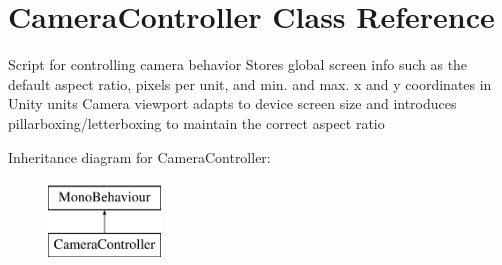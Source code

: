 \hypertarget{class_camera_controller}{}\section{Camera\+Controller Class Reference}
\label{class_camera_controller}


Script for controlling camera behavior Stores global screen info such as the default aspect ratio, pixels per unit, and min. and max. x and y coordinates in Unity units Camera viewport adapts to device screen size and introduces pillarboxing/letterboxing to maintain the correct aspect ratio  


Inheritance diagram for Camera\+Controller\+:\begin{figure}[H]
\begin{center}
\leavevmode
\includegraphics[height=2.000000cm]{class_camera_controller}
\end{center}
\end{figure}
